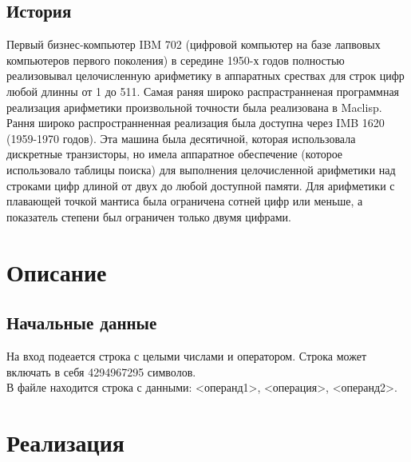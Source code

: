 \documentclass[a4paper]{article}
\begin{document}
\subsection{История}
Первый бизнес-компьютер IBM 702 (цифровой компьютер на базе лапвовых компьютеров первого поколения) в середине 1950-х годов полностью реализовывал целочисленную арифметику в аппаратных срествах для строк цифр любой длинны от 1 до 511. Самая раняя широко распрастранненая программная реализация арифметики произвольной точности была реализована в Maclisp. 
\\Рання широко распространненная реализация была доступна через IMB 1620 (1959-1970 годов). Эта машина была десятичной, которая использовала дискретные транзисторы, но имела аппаратное обеспечение (которое использовало таблицы поиска) для выполнения целочисленной арифметики над строками цифр длиной от двух до любой доступной памяти. Для арифметики с плавающей точкой мантиса была ограничена сотней цифр или меньше, а показатель степени был ограничен только двумя цифрами. 
\newpage

\section{Описание}
\subsection{Начальные данные}
На вход подеается строка с целыми числами и оператором. Строка может включать в себя 4294967295 символов. 
\\В файле находится строка с данными: <операнд1>, <операция>, <операнд2>.
\newpage

\section{Реализация}
\end{document}
